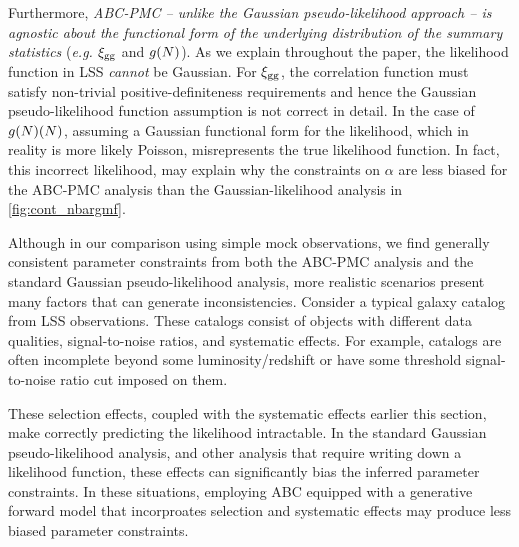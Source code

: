 Furthermore, {\em ABC-PMC -- unlike the Gaussian pseudo-likelihood approach -- 
is agnostic about the functional form of the underlying distribution of the 
summary statistics} (\emph{e.g.} $\xi_{\mathrm{gg}}$ and $g(N)$). As we explain throughout 
the paper, the likelihood function in LSS {\em cannot} be Gaussian. For $\xi_{\mathrm{gg}}$, 
the correlation function must satisfy non-trivial positive-definiteness requirements 
and hence the Gaussian pseudo-likelihood function assumption is not correct 
in detail. In the case of $g(N)(N)$, assuming a Gaussian functional form for 
the likelihood, which in reality is more likely Poisson, misrepresents the true 
likelihood function. In fact, this incorrect 
likelihood, may explain why the constraints on $\alpha$ are less biased for 
the ABC-PMC analysis than the Gaussian-likelihood analysis in \ref{fig:cont_nbargmf}.


Although in our comparison using simple mock observations, we find generally 
consistent parameter constraints from both the ABC-PMC analysis and the standard 
Gaussian pseudo-likelihood analysis, more realistic scenarios present many factors
that can generate inconsistencies. Consider a typical galaxy catalog from 
LSS observations. These catalogs consist of objects with different data 
qualities, signal-to-noise ratios, and systematic effects. For example, catalogs 
are often incomplete beyond some luminosity/redshift or have some threshold 
signal-to-noise ratio cut imposed on them.


These selection effects, coupled with the systematic effects earlier this section, 
make correctly predicting the likelihood intractable. In the standard Gaussian 
pseudo-likelihood analysis, and other analysis that require writing down a 
likelihood function, these effects can significantly 
bias the inferred parameter constraints. In these situations, employing
ABC equipped with a generative forward model that incorproates selection and 
systematic effects may produce less biased parameter constraints. 

